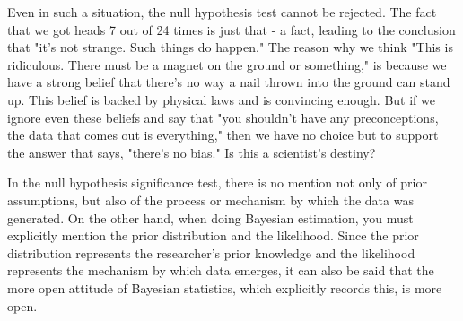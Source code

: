 \documentclass{ltjbook}
\begin{document}
Even in such a situation, the null hypothesis test cannot be rejected. The fact that we got heads 7 out of 24 times is just that - a fact, leading to the conclusion that "it's not strange. Such things do happen." The reason why we think "This is ridiculous. There must be a magnet on the ground or something," is because we have a strong belief that there's no way a nail thrown into the ground can stand up. This belief is backed by physical laws and is convincing enough. But if we ignore even these beliefs and say that "you shouldn't have any preconceptions, the data that comes out is everything," then we have no choice but to support the answer that says, "there's no bias." Is this a scientist's destiny?

In the null hypothesis significance test, there is no mention not only of prior assumptions, but also of the process or mechanism by which the data was generated. On the other hand, when doing Bayesian estimation, you must explicitly mention the prior distribution and the likelihood. Since the prior distribution represents the researcher's prior knowledge and the likelihood represents the mechanism by which data emerges, it can also be said that the more open attitude of Bayesian statistics, which explicitly records this, is more open.


\end{document}
